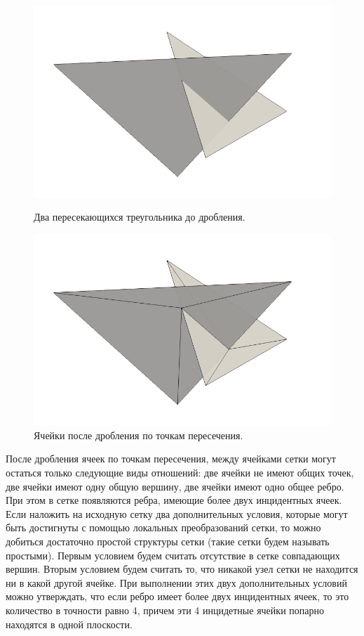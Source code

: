 \documentclass[
11pt,%
tightenlines,%
twoside,%
onecolumn,%
nofloats,%
nobibnotes,%
nofootinbib,%
superscriptaddress,%
noshowpacs,%
centertags]%
{revtex4}
\begin{document}
\begin{figure}[h]
  \centering
  \begin{minipage}[h]{0.4\textwidth}
    \includegraphics[width=\textwidth]{pics/pic_before_cut.png}
    \caption{Два пересекающихся треугольника до дробления.}\label{fig:pic_before_cut}
  \end{minipage}
  \begin{minipage}[h]{0.4\textwidth}
    \includegraphics[width=\textwidth]{pics/pic_after_cut.png}
    \caption{Ячейки после дробления по точкам пересечения.}\label{fig:pic_after_cut}
  \end{minipage}
\end{figure}

После дробления ячеек по точкам пересечения, между ячейками сетки могут остаться только следующие виды отношений: две ячейки не имеют общих точек, две ячейки имеют одну общую вершину, две ячейки имеют одно общее ребро.
При этом в сетке появляются ребра, имеющие более двух инцидентных ячеек.
Если наложить на исходную сетку два дополнительных условия, которые могут быть достигнуты с помощью локальных преобразований сетки, то можно добиться достаточно простой структуры сетки (такие сетки будем называть простыми).
Первым условием будем считать отсутствие в сетке совпадающих вершин.
Вторым условием будем считать то, что никакой узел сетки не находится ни в какой другой ячейке.
При выполнении этих двух дополнительных условий можно утверждать, что если ребро имеет более двух инцидентных ячеек, то это количество в точности равно 4, причем эти 4 инцидетные ячейки попарно находятся в одной плоскости.
\end{document}
